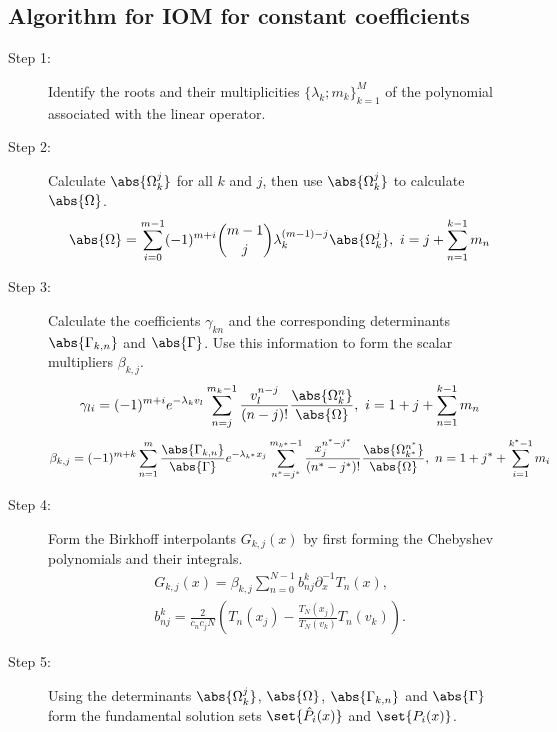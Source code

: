 \documentclass{article}
\begin{document}
\subsection{Algorithm for IOM for constant coefficients}

\begin{description}
\item[Step 1:] Identify the roots and their multiplicities $\{ \lambda_k ; m_k \}_{k=1}^M$ of the polynomial associated with the linear operator.
\item[Step 2:] Calculate $\abs{\Omega_k^j}$ for all $k$ and $j$, then use $\abs{\Omega_k^j}$ to calculate $\abs{\Omega}$.
\begin{equation*}
\abs{\Omega} = \sum_{i=0}^{m-1} (-1)^{m+i} \binom{m-1}{j} \lambda_k^{(m-1)-j} \abs{\Omega_k^j}, \ i = j + \sum_{n=1}^{k-1} m_n
\end{equation*}
\item[Step 3:] Calculate the coefficients $\gamma_{kn}$ and the corresponding determinants $\abs{\Gamma_{k,n}}$ and $\abs{\Gamma}$. Use this information to form the scalar multipliers $\beta_{k,j}$.
\begin{equation*}
\gamma_{li} = (-1)^{m+i} e^{-\lambda_k v_l} \sum_{n=j}^{m_k-1} \frac{v_l^{n-j}}{(n-j)!} \frac{\abs{\Omega_k^n}}{\abs{\Omega}}, \ i = 1 + j + \sum_{n=1}^{k-1} m_n
\end{equation*}
\begin{equation*}
\beta_{k,j} = (-1)^{m+k} \sum_{n=1}^m \frac{\abs{\Gamma_{k,n}}}{\abs{\Gamma}} e^{-\lambda_{k^*} x_j} \sum_{n^*=j^*}^{m_{k^*}-1} \frac{x_j^{n^*-j^*}}{(n^*-j^*)!} \frac{\abs{\Omega_{k^*}^{n^*}}}{\abs{\Omega}}, \ n = 1 + j^* + \sum_{i=1}^{k^*-1} m_i
\end{equation*}
\item[Step 4:] Form the Birkhoff interpolants $G_{k,j}(x)$ by first forming the Chebyshev polynomials and their integrals.
\begin{equation*}
\begin{gathered}
G_{k,j} (x) = \beta_{k,j} \sum_{n=0}^{N-1} b^k_{nj} \partial_x^{-1} T_n(x), \\
 b^k_{nj} = \frac{2}{c_n c_j N} \left ( T_n(x_j) - \frac{T_N(x_j)}{T_N(v_k)} T_n(v_k) \right ).
\end{gathered}
\end{equation*}
\item[Step 5:] Using the determinants $\abs{\Omega_k^j}$, $\abs{\Omega}$, $\abs{\Gamma_{k,n}}$ and $\abs{\Gamma}$ form the fundamental solution sets $\set{\hat{P}_i(x)}$ and $\set{P_i(x)}$.

\end{description}
\end{document}
